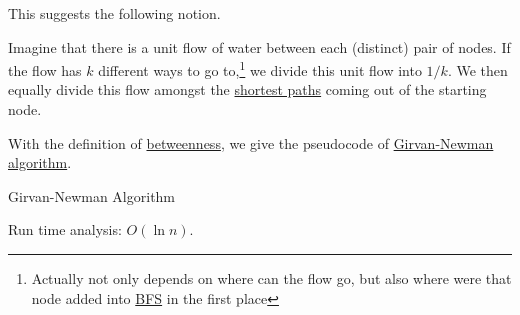 This suggests the following notion.
\begin{definition}[Betweenness]\label{def:betweenness}
	Imagine that there is a unit flow of water between each (distinct) pair of nodes. If the flow has \(k\) different ways to go to,\footnote{Actually not only depends on where can the flow go, but also where were that node added into \hyperref[algo:BFS]{BFS} in the first place} we divide this unit flow into \(1/k\). We then equally divide this flow amongst the \hyperref[def:shortest-path]{shortest paths} coming out of the starting node.
\end{definition}

With the definition of \hyperref[def:betweenness]{betweenness}, we give the pseudocode of \hyperref[algo:Girvan-Newman-algorithm]{Girvan-Newman algorithm}.

\begin{algorithm}[H]\label{algo:Girvan-Newman-algorithm}
	\DontPrintSemicolon
	\caption{Girvan-Newman Algorithm}
	\BlankLine

	\;
	\Return{}\;
\end{algorithm}

\begin{remark}
	Run time analysis: \(O(\ln n)\).
\end{remark}